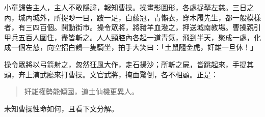小童歸告主人，主人不敢隱諱，報知曹操。操畫影圖形，各處捉拏左慈。三日之內，城內城外，所捉眇一目，跛一足，白藤冠，青懶衣，穿木履先生，都一般模樣者，有三四百個。鬨動街市。操令眾將，將豬羊血潑之，押送城南教場。曹操親引甲兵五百人圍住，盡皆斬之。人人頸腔內各起一道青氣，飛到半天，聚成一處，化成一個左慈，向空招白鶴一隻騎坐，拍手大笑曰：「土鼠隨金虎，奸雄一旦休！」

操令眾將以弓箭射之，忽然狂風大作，走石揚沙；所斬之屍，皆跳起來，手提其頭，奔上演武廳來打曹操。文官武將，掩面驚倒，各不相顧。正是：

\begin{quote}
奸雄權勢能傾國，道士仙機更異人。
\end{quote}

未知曹操性命如何，且看下文分解。
